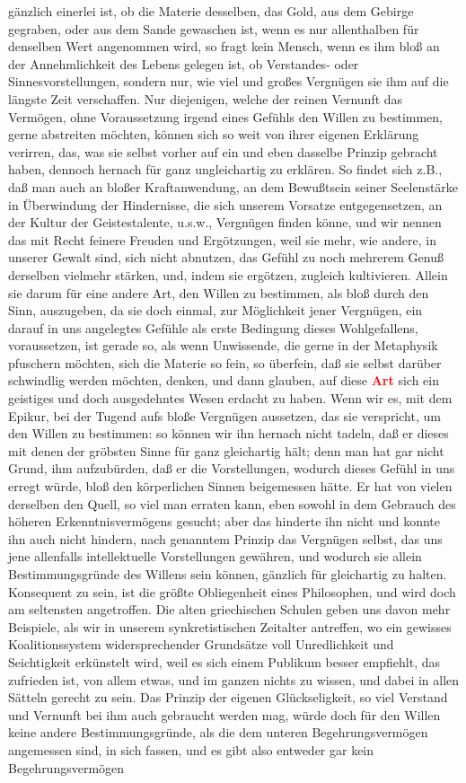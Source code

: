 \documentclass[a4paper,12pt,twoside]{book}
\newcommand{\match}[1]{\textcolor{red}{\textbf{#1}}}
\begin{document}
gänzlich einerlei ist, ob die Materie desselben, das Gold, aus dem Gebirge gegraben, oder aus dem Sande gewaschen ist, wenn es nur allenthalben für denselben Wert angenommen wird, so fragt kein Mensch, wenn es ihm bloß an der Annehmlichkeit des Lebens gelegen ist, ob Verstandes- oder Sinnesvorstellungen, sondern nur, wie viel und großes Vergnügen sie ihm auf die längste Zeit verschaffen. Nur diejenigen, welche der reinen Vernunft das Vermögen, ohne Voraussetzung irgend eines Gefühls den Willen zu bestimmen, gerne abstreiten möchten, können sich so weit von ihrer eigenen Erklärung verirren, das, was sie selbst vorher auf ein und eben dasselbe Prinzip gebracht haben, dennoch hernach für ganz ungleichartig zu erklären. So findet sich z.B., daß man auch an bloßer Kraftanwendung, an dem Bewußtsein seiner Seelenstärke in Überwindung der Hindernisse, die sich unserem Vorsatze entgegensetzen, an der Kultur der Geistestalente, u.s.w., Vergnügen finden könne, und wir nennen das mit Recht feinere Freuden und Ergötzungen, weil sie mehr, wie andere, in unserer Gewalt sind, sich nicht abnutzen, das Gefühl zu noch mehrerem Genuß derselben vielmehr stärken, und, indem sie ergötzen, zugleich kultivieren. Allein sie darum für eine andere Art, den Willen zu bestimmen, als bloß durch den Sinn, auszugeben, da sie doch einmal, zur Möglichkeit jener Vergnügen, ein darauf in uns angelegtes Gefühle als erste Bedingung dieses Wohlgefallens, voraussetzen, ist gerade so, als wenn Unwissende, die gerne in der Metaphysik pfuschern möchten, sich die Materie so fein, so überfein, daß sie selbst darüber schwindlig werden möchten, denken, und dann glauben, auf diese \match{Art} sich ein geistiges und doch ausgedehntes Wesen erdacht zu haben. Wenn wir es, mit dem Epikur, bei der Tugend aufs bloße Vergnügen aussetzen, das sie verspricht, um den Willen zu bestimmen: so können wir ihn hernach nicht tadeln, daß er dieses mit denen der gröbsten Sinne für ganz gleichartig hält; denn man hat gar nicht Grund, ihm aufzubürden, daß er die Vorstellungen, wodurch dieses Gefühl in uns erregt würde, bloß den körperlichen Sinnen beigemessen hätte. Er hat von vielen derselben  den Quell, so viel man erraten kann, eben sowohl in dem Gebrauch des höheren Erkenntnisvermögens gesucht; aber das hinderte ihn nicht und konnte ihn auch nicht hindern, nach genanntem Prinzip das Vergnügen selbst, das uns jene allenfalls intellektuelle Vorstellungen gewähren, und wodurch sie allein Bestimmungsgründe des Willens sein können, gänzlich für gleichartig zu halten. Konsequent zu sein, ist die größte Obliegenheit eines Philosophen, und wird doch am seltensten angetroffen. Die alten griechischen Schulen geben uns davon mehr Beispiele, als wir in unserem synkretistischen Zeitalter antreffen, wo ein gewisses Koalitionssystem widersprechender Grundsätze voll Unredlichkeit und Seichtigkeit erkünstelt wird, weil es sich einem Publikum besser empfiehlt, das zufrieden ist, von allem etwas, und im ganzen nichts zu wissen, und dabei in allen Sätteln gerecht zu sein. Das Prinzip der eigenen Glückseligkeit, so viel Verstand und Vernunft bei ihm auch gebraucht werden mag, würde doch für den Willen keine andere Bestimmungsgründe, als die dem unteren Begehrungsvermögen angemessen sind, in sich fassen, und es gibt also entweder gar kein Begehrungsvermögen 
\end{document}
